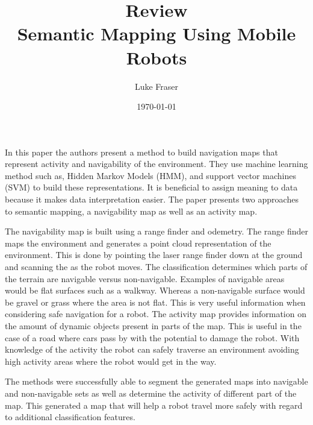 \documentclass{article}
\begin{document}
\title{{\large Review} \\ Semantic Mapping Using Mobile Robots}
\author{Luke Fraser}
\date{\today}
\maketitle

\begingroup
\renewcommand{\section}[2]{}


\endgroup

\section*{Summary}
In this paper the authors present a method to build navigation maps that represent activity and navigability of the environment. They use machine learning method such as, Hidden Markov Models (HMM), and support vector machines (SVM) to build these representations. It is beneficial to assign meaning to data because it makes data interpretation easier. The paper presents two approaches to semantic mapping, a navigability map as well as an activity map.

The navigability map is built using a range finder and odemetry. The range finder maps the environment and generates a point cloud representation of the environment. This is done by pointing the laser range finder down at the ground and scanning the as the robot moves. The classification determines which parts of the terrain are navigable versus non-navigable. Examples of navigable areas would be flat surfaces such as a walkway. Whereas a non-navigable surface would be gravel or grass where the area is not flat. This is very useful information when considering safe navigation for a robot. The activity map provides information on the amount of dynamic objects present in parts of the map. This is useful in the case of a road where cars pass by with the potential to damage the robot. With knowledge of the activity the robot can safely traverse an environment avoiding high activity areas where the robot would get in the way.

The methods were successfully able to segment the generated maps into navigable and non-navigable sets as well as determine the activity of different part of the map. This generated a map that will help a robot travel more safely with regard to additional classification features.
\end{document}
